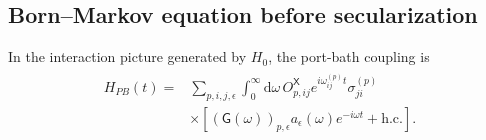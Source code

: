 \documentclass[prx,aps,twocolumn,article]{revtex4-2}
\newcommand{\msf}[1]{\mathsf{#1}}
\newcommand{\hc}{\mathrm{h.c.}}
\newcommand{\msG}{\msf{G}}
\newcommand{\msX}{\msf{X}}
\begin{document}
\subsection{Born--Markov equation before secularization}

In the interaction picture generated by $H_0$, the port-bath coupling is
\begin{align}
\begin{aligned}
    H_{PB}(t)
    ={}&
    \sum_{p,i,j,\epsilon}
    \int_0^\infty\!\mathrm d\omega\,
    O_{p,ij}^{\msX}
    e^{i\omega_{ij}^{(p)}t}
    \sigma_{ji}^{(p)}
    \\
    &\times
    \left[
        (\msG(\omega))_{p,\epsilon}
        a_\epsilon(\omega)e^{-i\omega t}
        +\hc
    \right].
\end{aligned}
\label{Eq:AEInteractionPicture}
\end{align}
\end{document}

